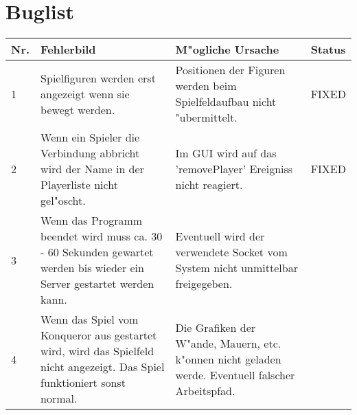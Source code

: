 \chapter{Buglist}


\begin{tabular}{|p{5mm}|p{60mm}|p{65mm}|p{10mm}|}
\hline
\textbf{Nr.} & \textbf{Fehlerbild} & \textbf{M"ogliche Ursache} & \textbf{Status}  \\
\hline
1 &
Spielfiguren werden erst angezeigt wenn sie bewegt werden.  &
Positionen der Figuren werden beim Spielfeldaufbau nicht "ubermittelt.  &
FIXED  \\
\hline
2 &
Wenn ein Spieler die Verbindung abbricht wird der Name in der Playerliste nicht gel"oscht.  &
Im GUI wird auf das 'removePlayer' Ereigniss nicht reagiert.  &
FIXED  \\
\hline
3 &
Wenn das Programm beendet wird muss ca. 30 - 60 Sekunden gewartet werden bis wieder ein Server gestartet
  werden kann.  &
Eventuell wird der verwendete Socket vom System nicht unmittelbar freigegeben.  &
 \\
\hline
4 &
Wenn das Spiel vom Konqueror aus gestartet wird, wird das Spielfeld nicht angezeigt.
  Das Spiel funktioniert sonst normal.  &
Die Grafiken der W"ande, Mauern, etc. k"onnen nicht geladen werde. Eventuell falscher Arbeitspfad.  &
 \\
\hline


\end{tabular}


%
